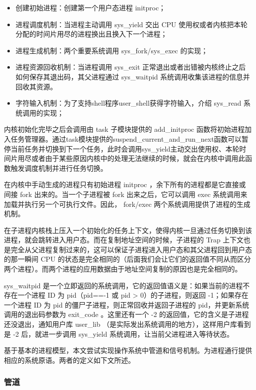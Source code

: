\begin{itemize}
\item 创建初始进程：创建第一个用户态进程 initproc；
\item 进程调度机制：当进程主动调用 sys\_yield 交出 CPU 使用权或者内核把本轮分配的时间片用尽的进程换出且换入下一个进程；
\item 进程生成机制：两个重要系统调用 sys\_fork/sys\_exec 的实现；
\item 进程资源回收机制：当进程调用 sys\_exit 正常退出或者出错被内核终止之后如何保存其退出码，其父进程通过 sys\_waitpid 系统调用收集该进程的信息并回收其资源。
\item 字符输入机制：为了支持shell程序user\_shell获得字符输入，介绍 sys\_read 系统调用的实现；
\end{itemize}

内核初始化完毕之后会调用由 task 子模块提供的 add\_initproc 函数将初始进程加入任务管理器。通过task模块提供的suspend\_current\_and\_run\_next函数可以暂停当前任务并切换到下一个任务，此时会调用sys\_yield主动交出使用权、本轮时间片用尽或者由于某些原因内核中的处理无法继续的时候，就会在内核中调用此函数触发调度机制并进行任务切换。

在内核中手动生成的进程只有初始进程 initproc ，余下所有的进程都是它直接或间接 fork 出来的。当一个子进程被 fork 出来之后，它可以调用 exec 系统调用来加载并执行另一个可执行文件。因此， fork/exec 两个系统调用提供了进程的生成机制。

在子进程内核栈上压入一个初始化的任务上下文，使得内核一旦通过任务切换到该进程，就会跳转进入用户态。而在复制地址空间的时候，子进程的 Trap 上下文也是完全从父进程复制过来的，这可以保证子进程进入用户态和其父进程回到用户态的那一瞬间 CPU 的状态是完全相同的（后面我们会让它们的返回值不同从而区分两个进程）。而两个进程的应用数据由于地址空间复制的原因也是完全相同的。

sys\_waitpid 是一个立即返回的系统调用，它的返回值语义是：如果当前的进程不存在一个进程 ID 为 pid（pid==-1 或 pid > 0）的子进程，则返回 -1；如果存在一个进程 ID 为 pid 的僵尸子进程，则正常回收并返回子进程的 pid，并更新系统调用的退出码参数为 exit\_code 。这里还有一个 -2 的返回值，它的含义是子进程还没退出，通知用户库 user\_lib （是实际发出系统调用的地方），这样用户库看到是 -2 后，就进一步调用 sys\_yield 系统调用，让当前父进程进入等待状态。

基于基本的进程模型，本文尝试实现操作系统中管道和信号机制。为进程通行提供相应的系统原语。两者的定义如下文所述。

\subsubsection{管道}


